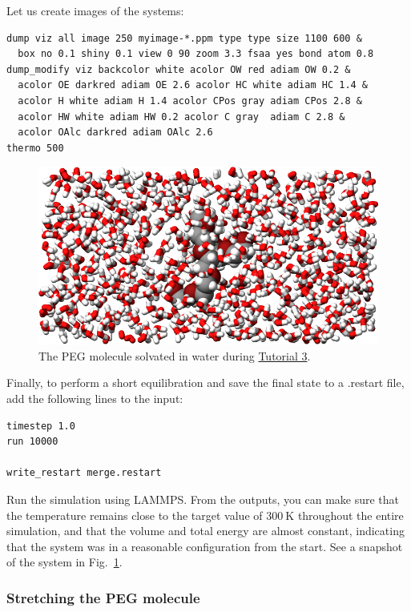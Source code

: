 \documentclass[9pt,tutorial]{livecoms}
\newcommand{\lmpcmd}[1]{\hspace{0pt}\colorbox{listing}{\textcolor{command}{\small{#1}}}\hspace{0pt}} %
\begin{document}
\noindent Let us create images of the systems:
\begin{lstlisting}
dump viz all image 250 myimage-*.ppm type type size 1100 600 &
  box no 0.1 shiny 0.1 view 0 90 zoom 3.3 fsaa yes bond atom 0.8
dump_modify viz backcolor white acolor OW red adiam OW 0.2 &
  acolor OE darkred adiam OE 2.6 acolor HC white adiam HC 1.4 &
  acolor H white adiam H 1.4 acolor CPos gray adiam CPos 2.8 &
  acolor HW white adiam HW 0.2 acolor C gray  adiam C 2.8 &
  acolor OAlc darkred adiam OAlc 2.6
thermo 500
\end{lstlisting}
\begin{figure}
\centering
\includegraphics[width=\linewidth]{PEG-solvated}
\caption{The PEG molecule solvated in water during
\hyperref[all-atom-label]{Tutorial 3}.}
\label{fig:PEG-solvated}
\end{figure}
Finally, to perform a short equilibration and save the final state to
a \lmpcmd{.restart} file, add the following lines to the input:
\begin{lstlisting}
timestep 1.0
run 10000

write_restart merge.restart
\end{lstlisting}
Run the simulation using LAMMPS.  From the outputs, you can make
sure that the temperature remains close to the
target value of $300~\text{K}$ throughout the entire simulation, and that
the volume and total energy are almost constant, indicating
that the system was in a reasonable configuration from the start.
See a snapshot of the system in Fig.~\ref{fig:PEG-solvated}.

\subsubsection{Stretching the PEG molecule}
\end{document}
